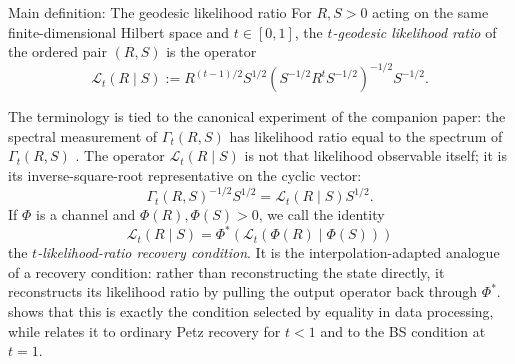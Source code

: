 \documentclass[11pt]{article}
\theoremstyle{remark}
\newcommand{\1}{\mathbbm{1}}
\begin{document}
\begin{mainobject}{Main definition: The geodesic likelihood ratio}
For $R,S>0$ acting on the same finite-dimensional Hilbert space and
$t\in[0,1]$, the \emph{$t$-geodesic likelihood ratio} of the
ordered pair $(R,S)$ is the operator
\begin{equation}
 \mathcal L_t(R\mid S)
 :=R^{(t-1)/2}S^{1/2}
 \left(S^{-1/2}R^tS^{-1/2}\right)^{-1/2}S^{-1/2}.
 \label{eq:consolidated-likelihood}
\end{equation}
\end{mainobject}
The terminology is tied to the canonical experiment of the companion
paper: the spectral measurement of $\Gamma_t(R,S)$ has likelihood
ratio equal to the spectrum of $\Gamma_t(R,S)$
\cite[Theorem~3.1]{capel2026informationgeometry}.  The operator
$\mathcal L_t(R\mid S)$ is not that likelihood observable itself; it
is its inverse-square-root representative on the cyclic vector:
\begin{equation}
 \Gamma_t(R,S)^{-1/2}S^{1/2}
 =\mathcal L_t(R\mid S)S^{1/2}.
 \label{eq:consolidated-likelihood-vector}
\end{equation}
If $\Phi$ is a channel and $\Phi(R),\Phi(S)>0$, we call the identity
\begin{equation}
 \boxed{
 \mathcal L_t(R\mid S)
 =\Phi^*\!\left(
 \mathcal L_t(\Phi(R)\mid\Phi(S))\right)}
 \label{eq:consolidated-channel-likelihood}
\end{equation}
the \emph{$t$-likelihood-ratio recovery condition}.  It is the
interpolation-adapted analogue of a recovery condition: rather than
reconstructing the state directly, it reconstructs its likelihood
ratio by pulling the output operator back through $\Phi^*$.
 shows that this is exactly
the condition selected by equality in data processing, while
 relates it to
ordinary Petz recovery for $t<1$ and to the BS condition at $t=1$.
\end{document}
